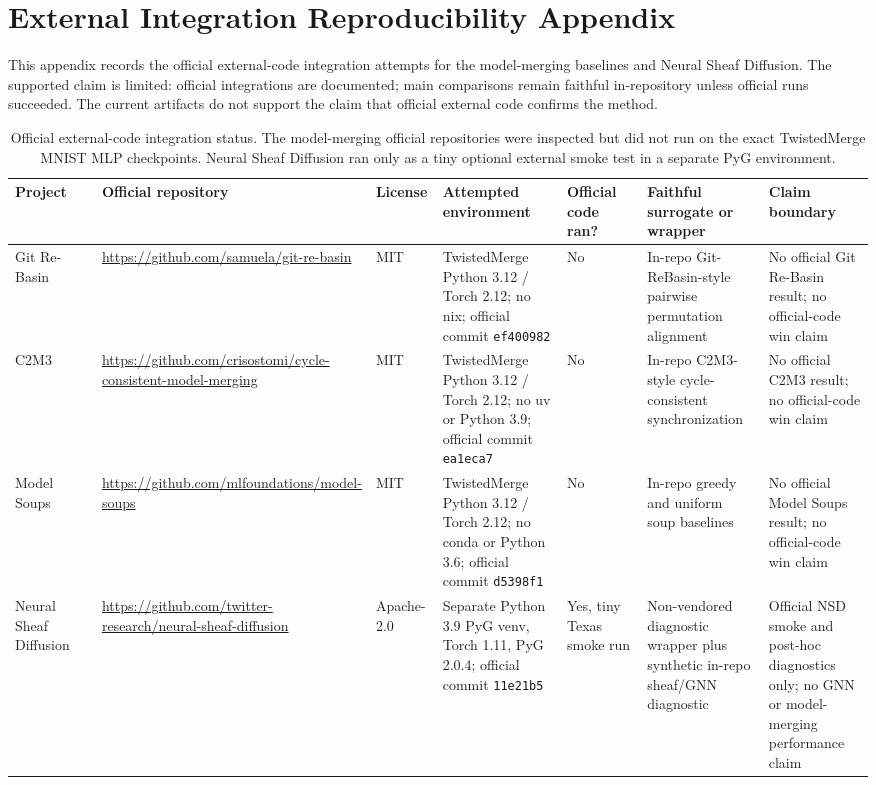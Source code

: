 \section{External Integration Reproducibility Appendix}
\label{app:external-integration}

This appendix records the official external-code integration attempts for the
model-merging baselines and Neural Sheaf Diffusion.  The supported claim is
limited: official integrations are documented; main comparisons remain faithful
in-repository unless official runs succeeded.  The current artifacts do not
support the claim that official external code confirms the method.

\begin{table}[t]
\centering
\scriptsize
\begin{tabular}{p{0.13\linewidth}p{0.18\linewidth}p{0.08\linewidth}p{0.18\linewidth}p{0.12\linewidth}p{0.16\linewidth}p{0.15\linewidth}}
\hline
Project & Official repository & License & Attempted environment & Official code ran? & Faithful surrogate or wrapper & Claim boundary \\
\hline
Git Re-Basin & \url{https://github.com/samuela/git-re-basin} & MIT & TwistedMerge Python 3.12 / Torch 2.12; no nix; official commit \texttt{ef400982} & No & In-repo Git-ReBasin-style pairwise permutation alignment & No official Git Re-Basin result; no official-code win claim \\
C2M3 & \url{https://github.com/crisostomi/cycle-consistent-model-merging} & MIT & TwistedMerge Python 3.12 / Torch 2.12; no uv or Python 3.9; official commit \texttt{ea1eca7} & No & In-repo C2M3-style cycle-consistent synchronization & No official C2M3 result; no official-code win claim \\
Model Soups & \url{https://github.com/mlfoundations/model-soups} & MIT & TwistedMerge Python 3.12 / Torch 2.12; no conda or Python 3.6; official commit \texttt{d5398f1} & No & In-repo greedy and uniform soup baselines & No official Model Soups result; no official-code win claim \\
Neural Sheaf Diffusion & \url{https://github.com/twitter-research/neural-sheaf-diffusion} & Apache-2.0 & Separate Python 3.9 PyG venv, Torch 1.11, PyG 2.0.4; official commit \texttt{11e21b5} & Yes, tiny Texas smoke run & Non-vendored diagnostic wrapper plus synthetic in-repo sheaf/GNN diagnostic & Official NSD smoke and post-hoc diagnostics only; no GNN or model-merging performance claim \\
\hline
\end{tabular}
\caption{Official external-code integration status.  The model-merging
official repositories were inspected but did not run on the exact TwistedMerge
MNIST MLP checkpoints.  Neural Sheaf Diffusion ran only as a tiny optional
external smoke test in a separate PyG environment.}
\label{tab:external-integration-status}
\end{table}

